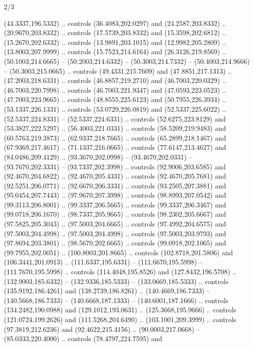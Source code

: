 \begin{flagdescription}{2/3}
\begin{scope}[xshift=0.5\flaglength,yshift=0.5\flagwidth,scale=\flagwidth/525.28]
\begin{scope}[y=0.1mm, x=0.1mm, yscale=-1,shift={(-381.5,-404)}]
\begin{scope}[shift={(5.25001,4.53053)},miter limit=4.00,line width=0.800\lw]
  (44.3337,196.5332) .. controls (36.4083,202.0297) and (24.2587,203.8332) ..
  (20.9670,203.8332) .. controls (17.5739,203.8332) and (15.3598,202.6812) ..
  (15.2670,202.6332) .. controls (13.9891,203.1015) and (12.9982,205.2809) ..
  (13.8003,207.9999) .. controls (15.7523,214.6164) and (26.3126,219.8569) ..
  (50.1003,214.6665) -- (50.2003,214.6332) -- (50.3003,214.7332) --
  (50.4003,214.9666) -- (50.3003,215.0665) .. controls (49.4331,215.7609) and
  (47.8851,217.1313) .. (47.2003,218.6331) .. controls (46.8857,219.2710) and
  (46.7003,220.0329) .. (46.7003,220.7998) .. controls (46.7003,221.9347) and
  (47.0593,223.0523) .. (47.7003,223.9665) .. controls (48.8555,225.6123) and
  (50.7955,226.3934) .. (53.1337,226.1331) .. controls (53.0729,226.0819) and
  (52.5337,225.6022) .. (52.5337,224.8331) -- (52.5337,224.6331) .. controls
  (52.6275,223.8129) and (53.3827,222.5297) .. (56.4003,221.0331) .. controls
  (58.5209,219.9483) and (60.5763,219.3873) .. (62.9337,218.7665) .. controls
  (65.2899,218.1467) and (67.9369,217.4617) .. (71.1337,216.0665) .. controls
  (77.6147,213.4627) and (84.0486,209.4129) .. (93.3670,202.0998) --
  (93.4670,202.0331) -- (93.7670,202.3331) -- (93.7337,202.3998) .. controls
  (92.9006,203.6585) and (92.4670,204.6822) .. (92.4670,205.4331) .. controls
  (92.4670,205.7681) and (92.5251,206.0771) .. (92.6670,206.3331) .. controls
  (93.2505,207.3881) and (95.0454,207.7443) .. (97.9670,207.3998) .. controls
  (98.8993,207.0542) and (99.3113,206.8001) .. (99.3337,206.5665) .. controls
  (99.3337,206.3467) and (99.0718,206.1670) .. (98.7337,205.9665) .. controls
  (98.2302,205.6667) and (97.5825,205.3043) .. (97.5003,204.6665) .. controls
  (97.4992,204.6575) and (97.5003,204.4998) .. (97.5003,204.4998) .. controls
  (97.5003,203.9793) and (97.8694,203.3801) .. (98.5670,202.6665) .. controls
  (99.0918,202.1065) and (99.7955,202.0051) .. (100.8003,201.8665) .. controls
  (102.8718,201.5806) and (106.3441,201.0913) .. (111.6337,195.6331) --
  (111.6670,195.5998) -- (111.7670,195.5998) .. controls (114.4048,195.8526) and
  (127.8432,196.5708) .. (132.9003,185.6332) -- (132.9336,185.5333) --
  (133.0669,185.5333) .. controls (135.9192,186.4261) and (138.2739,186.8261) ..
  (140.4669,186.7333) -- (140.5668,186.7333) -- (140.6668,187.1333) --
  (140.6001,187.1666) .. controls (134.2482,190.0988) and (129.1012,193.0631) ..
  (125.3668,195.9666) .. controls (121.0724,199.2626) and (111.5268,204.6490) ..
  (103.1001,209.3999) .. controls (97.3819,212.6236) and (92.4622,215.4156) ..
  (90.0003,217.0668) -- (85.0333,220.4000) .. controls (78.4797,224.7595) and

\end{scope}
\end{scope}
\end{scope}
\end{flagdescription}
